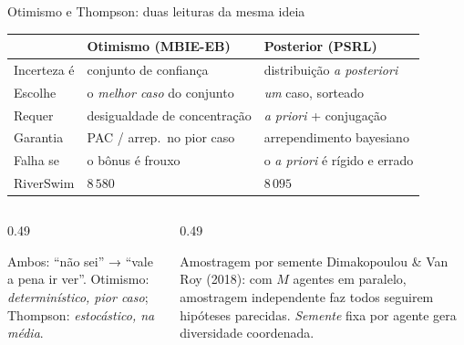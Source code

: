 \documentclass[aspectratio=169, 11pt]{beamer}
\begin{document}
\begin{frame}{Otimismo e Thompson: duas leituras da mesma ideia}
  \centering\small
  \begin{tabular}{@{}l>{\raggedright\arraybackslash}p{}>{\raggedright\arraybackslash}p{}@{}}
    \toprule
     & \textbf{Otimismo (MBIE-EB)} & \textbf{Posterior (PSRL)} \\
    \midrule
    Incerteza é & conjunto de confiança & distribuição \textit{a posteriori} \\
    Escolhe     & o \emph{melhor caso} do conjunto & \emph{um} caso, sorteado \\
    Requer      & desigualdade de concentração & \textit{a priori} + conjugação \\
    Garantia    & PAC / arrep.\ no pior caso & arrependimento bayesiano \\
    Falha se    & o bônus é frouxo & o \textit{a priori} é rígido e errado \\
    RiverSwim   & $8\,580$ & $8\,095$ \\
    \bottomrule
  \end{tabular}
  \vspace{0.5em}
  \begin{columns}[T]
    \begin{column}{0.49\textwidth}
      \begin{ideiabox}
        Ambos: ``não sei'' → ``vale a pena ir ver''. Otimismo: \emph{determinístico,
        pior caso}; Thompson: \emph{estocástico, na média}.
      \end{ideiabox}
    \end{column}
    \begin{column}{0.49\textwidth}
      \begin{teobox}{Amostragem por semente}
        Dimakopoulou \& Van Roy (2018): com $M$ agentes em paralelo, amostragem
        independente faz todos seguirem hipóteses parecidas. \emph{Semente} fixa por
        agente gera diversidade coordenada.
      \end{teobox}
    \end{column}
  \end{columns}
\end{frame}
\end{document}
